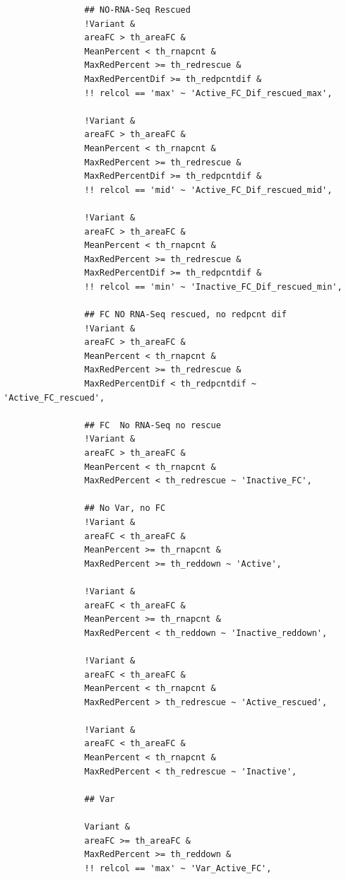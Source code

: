 \documentclass[11pt]{article}
\begin{document}
\begin{verbatim}
                ## NO-RNA-Seq Rescued
                !Variant &
                areaFC > th_areaFC &
                MeanPercent < th_rnapcnt &
                MaxRedPercent >= th_redrescue &
                MaxRedPercentDif >= th_redpcntdif &
                !! relcol == 'max' ~ 'Active_FC_Dif_rescued_max',

                !Variant &
                areaFC > th_areaFC &
                MeanPercent < th_rnapcnt &
                MaxRedPercent >= th_redrescue &
                MaxRedPercentDif >= th_redpcntdif &
                !! relcol == 'mid' ~ 'Active_FC_Dif_rescued_mid',

                !Variant &
                areaFC > th_areaFC &
                MeanPercent < th_rnapcnt &
                MaxRedPercent >= th_redrescue &
                MaxRedPercentDif >= th_redpcntdif &
                !! relcol == 'min' ~ 'Inactive_FC_Dif_rescued_min',

                ## FC NO RNA-Seq rescued, no redpcnt dif
                !Variant &
                areaFC > th_areaFC &
                MeanPercent < th_rnapcnt &
                MaxRedPercent >= th_redrescue &
                MaxRedPercentDif < th_redpcntdif ~ 'Active_FC_rescued',

                ## FC  No RNA-Seq no rescue
                !Variant &
                areaFC > th_areaFC &
                MeanPercent < th_rnapcnt &
                MaxRedPercent < th_redrescue ~ 'Inactive_FC',

                ## No Var, no FC
                !Variant &
                areaFC < th_areaFC &
                MeanPercent >= th_rnapcnt &
                MaxRedPercent >= th_reddown ~ 'Active',

                !Variant &
                areaFC < th_areaFC &
                MeanPercent >= th_rnapcnt &
                MaxRedPercent < th_reddown ~ 'Inactive_reddown',

                !Variant &
                areaFC < th_areaFC &
                MeanPercent < th_rnapcnt &
                MaxRedPercent > th_redrescue ~ 'Active_rescued',

                !Variant &
                areaFC < th_areaFC &
                MeanPercent < th_rnapcnt &
                MaxRedPercent < th_redrescue ~ 'Inactive',

                ## Var

                Variant &
                areaFC >= th_areaFC &
                MaxRedPercent >= th_reddown &
                !! relcol == 'max' ~ 'Var_Active_FC',


\end{verbatim}
\end{document}
